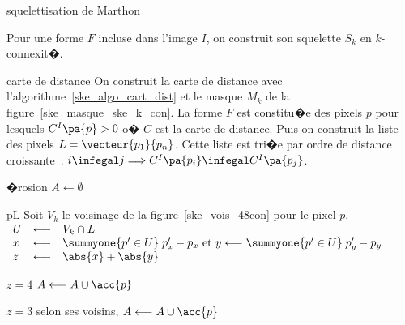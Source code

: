         \begin{xalgorithm}{squelettisation de Marthon}
        \label{ske_algo_ske_ero_algo_marthon}
        
        Pour une forme $F$ incluse dans l'image $I$, on construit son squelette $S_k$ en $k$-connexit�.
        
        \begin{xalgostep}{carte de distance}
                On construit la carte de distance avec l'algorithme~\ref{ske_algo_cart_dist} et le masque $M_k$ de la
                figure~\ref{ske_masque_ske_k_con}. La forme $F$ est constitu�e des pixels 
                $p$ pour lesquels $C^I\pa{p} > 0$ o� 
                $C$ est la carte de distance. Puis on construit la liste des pixels $L=\vecteur{p_1}{p_n}$. 
                Cette liste est tri�e 
                par ordre de distance croissante~: $i \infegal j \Longrightarrow C^I\pa{p_i} \infegal C^I\pa{p_j}$.
        \end{xalgostep}
        
        \begin{xalgostep}{�rosion}\label{ske_algo_ske_2_a}
                $A \longleftarrow \emptyset$ \\
                \begin{xforeach}{p}{L}
                    Soit $V_k$ le voisinage de la figure~\ref{ske_vois_48con} pour le pixel $p$.\\
                    $\begin{array}{lll}
                    U &\longleftarrow& V_k \cap L \\
                    x &\longleftarrow& \summyone{p' \in U} \; p'_x - p_x \text{ et }    
                                y \longleftarrow \summyone{p' \in U} \; p'_y - p_y \\
                    z &\longleftarrow& \abs{x} + \abs{y}
                    \end{array}$ \\
                    \begin{xif}{$z = 4$}
                        $A \longleftarrow A \cup \acc{p}$ 
                    \xelse
                        \begin{xif}{$z = 3$}
                            selon ses voisins, $A \longleftarrow A \cup \acc{p}$
                        \end{xif}
                    \end{xif}
                \end{xforeach}
        \end{xalgostep}
        

\end{xalgorithm}
